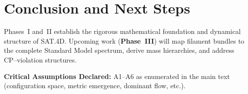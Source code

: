 \documentclass[11pt]{article}
\begin{document}
\section{Conclusion and Next Steps}
Phases~I and~II establish the rigorous mathematical foundation and dynamical structure of SAT.4D.  Upcoming work (\textbf{Phase~III}) will map filament bundles to the complete Standard Model spectrum, derive mass hierarchies, and address CP--violation structures.

\bigskip
\noindent\textbf{Critical Assumptions Declared:}
A1--A6 as enumerated in the main text (configuration space, metric emergence, dominant flow, etc.).
\end{document}

